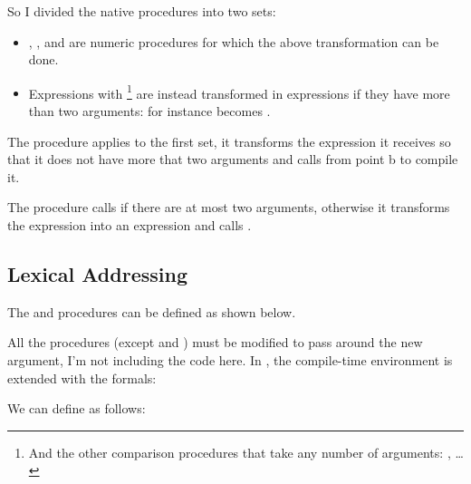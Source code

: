 \begin{exe}[5.38]
\begin{enumerate}
	    So I divided the native procedures into two sets:
	    \begin{itemize}
		\item \vscm{+}, \vscm{-}, \vscm{*} and \vscm{/} are numeric 
		    procedures for which the above transformation can be done.
		\item Expressions with \vscm{=}\footnote{And the other 
		    comparison procedures that take any number of arguments: 
		    \vscm{<}, \vscm{>}…} are instead transformed in  
		    expressions if they have more than two arguments: for 
		    instance becomes
		    .
	    \end{itemize}
	    The  procedure applies to the first set, 
	    it transforms the expression it receives so that it does not have 
	    more that two arguments and calls  from 
	    point b to compile it.

	    The  procedure calls 
	     if there are at most two arguments, 
	    otherwise it transforms the expression into an  expression 
	    and calls .
    \end{enumerate}
\end{exe}

\subsection{Lexical Addressing}

\begin{exe}[5.39]
    The  and  procedures 
    can be defined as shown below.
\end{exe}

\begin{exe}[5.40]
    All the  procedures (except  
    and ) must be modified to pass around the new argument, 
    I’m not including the code here. In , the 
    compile-time environment is extended with the formals:
\end{exe}

\begin{exe}[5.41]
    We can define  as follows:
\end{exe}


